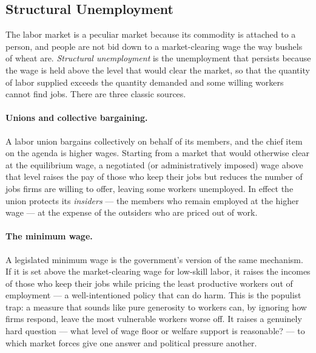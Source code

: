 \subsection{Structural Unemployment}

The labor market is a peculiar market because its commodity is attached to a person, and people are not bid down to a market-clearing wage the way bushels of wheat are. \emph{Structural unemployment} is the unemployment that persists because the wage is held above the level that would clear the market, so that the quantity of labor supplied exceeds the quantity demanded and some willing workers cannot find jobs. There are three classic sources.


\paragraph{Unions and collective bargaining.}
A labor union bargains collectively on behalf of its members, and the chief item on the agenda is higher wages. Starting from a market that would otherwise clear at the equilibrium wage, a negotiated (or administratively imposed) wage above that level raises the pay of those who keep their jobs but reduces the number of jobs firms are willing to offer, leaving some workers unemployed. In effect the union protects its \emph{insiders} --- the members who remain employed at the higher wage --- at the expense of the outsiders who are priced out of work.

\paragraph{The minimum wage.}
A legislated minimum wage is the government's version of the same mechanism. If it is set above the market-clearing wage for low-skill labor, it raises the incomes of those who keep their jobs while pricing the least productive workers out of employment --- a well-intentioned policy that can do harm. This is the populist trap: a measure that sounds like pure generosity to workers can, by ignoring how firms respond, leave the most vulnerable workers worse off. It raises a genuinely hard question --- what level of wage floor or welfare support is reasonable? --- to which market forces give one answer and political pressure another.

